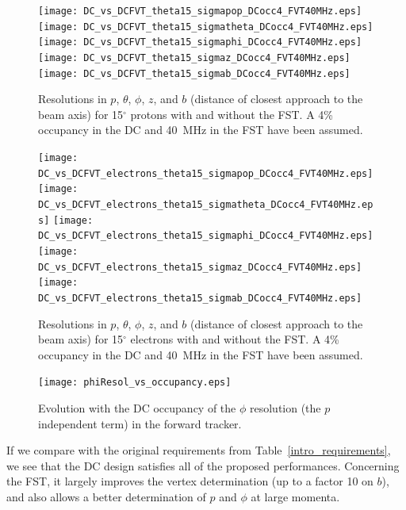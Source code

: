 \begin{figure}[ht!]
\centering
\texttt{[image: DC\_vs\_DCFVT\_theta15\_sigmapop\_DCocc4\_FVT40MHz.eps]}
\texttt{[image: DC\_vs\_DCFVT\_theta15\_sigmatheta\_DCocc4\_FVT40MHz.eps]}
\texttt{[image: DC\_vs\_DCFVT\_theta15\_sigmaphi\_DCocc4\_FVT40MHz.eps]}
\texttt{[image: DC\_vs\_DCFVT\_theta15\_sigmaz\_DCocc4\_FVT40MHz.eps]}
\texttt{[image: DC\_vs\_DCFVT\_theta15\_sigmab\_DCocc4\_FVT40MHz.eps]}
\caption{\small{Resolutions in $p$, $\theta$, $\phi$, $z$, and $b$ (distance of 
closest approach to the beam axis) for 15$^\circ$ protons with and without the FST. 
A 4\% occupancy in the DC and 40~MHz in the FST have been assumed.}}
\label{sec_forward:pic_resolproton}
\end{figure}

\begin{figure}[ht!]
\centering
\texttt{[image: DC\_vs\_DCFVT\_electrons\_theta15\_sigmapop\_DCocc4\_FVT40MHz.eps]}
\texttt{[image: DC\_vs\_DCFVT\_electrons\_theta15\_sigmatheta\_DCocc4\_FVT40MHz.eps]}
\texttt{[image: DC\_vs\_DCFVT\_electrons\_theta15\_sigmaphi\_DCocc4\_FVT40MHz.eps]}
\texttt{[image: DC\_vs\_DCFVT\_electrons\_theta15\_sigmaz\_DCocc4\_FVT40MHz.eps]}
\texttt{[image: DC\_vs\_DCFVT\_electrons\_theta15\_sigmab\_DCocc4\_FVT40MHz.eps]}
\caption{\small{Resolutions in $p$, $\theta$, $\phi$, $z$, and $b$ (distance of 
closest approach to the beam axis) for 15$^\circ$ electrons with and without the 
FST.  A 4\% occupancy in the DC and 40~MHz in the FST have been assumed.}}
\label{sec_forward:pic_resolelectron}
\end{figure}

\begin{figure}[ht!]
\centering
\texttt{[image: phiResol\_vs\_occupancy.eps]}
\caption{\small{Evolution with the DC occupancy of the $\phi$ resolution (the 
$p$ independent term) in the forward tracker.}}
\label{sec_forward:pic_phiresol}
\end{figure}

If we compare with the original requirements from Table~\ref{intro_requirements}, 
we see that the DC design satisfies all of the proposed performances.  Concerning 
the FST, it largely improves the vertex determination (up to a factor 10 on $b$), 
and also allows a better determination of $p$ and $\phi$ at large momenta.


